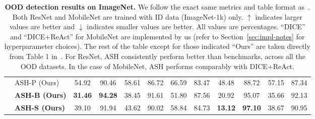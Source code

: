 \documentclass{article}
\newcommand{\secref}[1]{Section~\ref{sec:#1}}
\newcommand{\tablabel}[1]{\label{tab:#1}}
\begin{document}
\begin{table}[hbt!]
{\begin{tabular}{c c c c c c c c c c c c}
\rowcolor{lightgray} & \multicolumn{1}{l}{ASH-P (Ours)} & 54.92 & 90.46 & 58.61 & 86.72 & 66.59 & 83.47 & 48.48 & 88.72 & 57.15 & 87.34 \\
\rowcolor{lightgray} & \multicolumn{1}{l}{\textbf{ASH-B (Ours)}} & \textbf{31.46} & \textbf{94.28} & 38.45 & 91.61 & 51.80 & 87.56 & 20.92 & 95.07 & 35.66 & 92.13\\
\rowcolor{lightgray} & \multicolumn{1}{l}{\textbf{ASH-S (Ours)}} & 39.10 & 91.94 & 43.62 & 90.02 & 58.84 & 84.73 & \textbf{13.12} & \textbf{97.10} & 38.67 & 90.95 \\
\bottomrule

\end{tabular}}
\caption{\textbf{OOD detection results on ImageNet.} We follow the exact same metrics and table format as~\citet{react}. Both ResNet and MobileNet are trained with ID data (ImageNet-1k) only. $\uparrow$ indicates larger values are better and $\downarrow$ indicates smaller values are better. All values are percentages. ``DICE'' and ``DICE+ReAct'' for MobileNet are implemented by us (refer to \secref{impl-notes} for hyperparameter choices). The rest of the table except for those indicated ``Ours'' are taken directly from Table 1 in~\citet{react}. For ResNet, ASH consistently perform better than benchmarks, across all the OOD datasets. In the case of MobileNet, ASH performs comparably with DICE+ReAct.}
\tablabel{imagenet}

\end{table}
\end{document}
